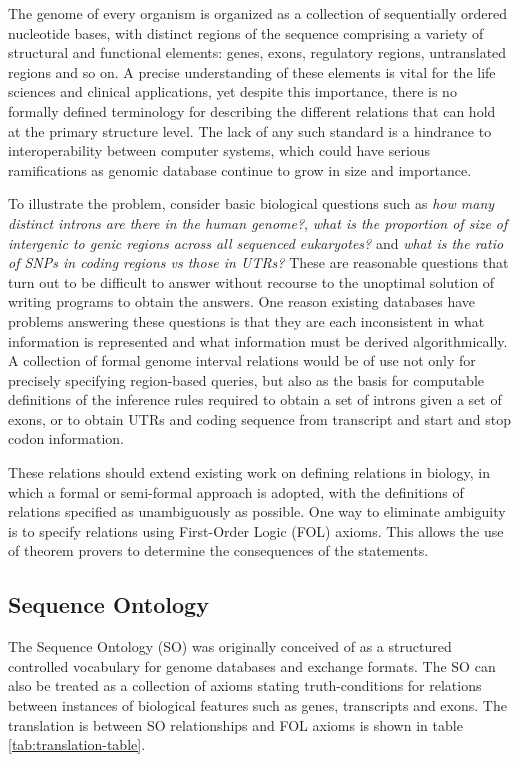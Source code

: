 \documentclass{article}
\begin{document}
The genome of every organism is organized as a collection of
sequentially ordered nucleotide bases, with distinct regions of the
sequence comprising a variety of structural and functional elements:
genes, exons, regulatory regions, untranslated regions and so on. A
precise understanding of these elements is vital for the life sciences
and clinical applications, yet despite this importance, there is no
formally defined terminology for describing the different relations
that can hold at the primary structure level. The lack of any such
standard is a hindrance to interoperability between computer systems,
which could have serious ramifications as genomic database continue to
grow in size and importance.

To illustrate the problem, consider basic biological questions such as
\emph{how many distinct introns are there in the human genome?},
\emph{what is the proportion of size of intergenic to genic regions
  across all sequenced eukaryotes?} and \emph{what is the ratio of
  SNPs in coding regions vs those in UTRs?} These are reasonable
questions that turn out to be difficult to answer without recourse to
the unoptimal solution of writing programs to obtain the answers. One
reason existing databases have problems answering these questions is
that they are each inconsistent in what information is represented and
what information must be derived algorithmically. A collection of
formal genome interval relations would be of use not only for
precisely specifying region-based queries, but also as the basis for
computable definitions of the inference rules required to obtain a set
of introns given a set of exons, or to obtain UTRs and coding sequence
from transcript and start and stop codon information.

These relations should extend existing work on defining relations in
biology\cite{Smith2005}, in which a formal or semi-formal approach is
adopted, with the definitions of relations specified as unambiguously
as possible. One way to eliminate ambiguity is to specify relations
using First-Order Logic (FOL) axioms. This allows the use of theorem
provers to determine the consequences of the statements.

\subsection{Sequence Ontology}

The Sequence Ontology (SO)\cite{Eilbeck2005} was originally conceived
of as a structured controlled vocabulary for genome databases and
exchange formats. The SO can also be treated as a collection of axioms
stating truth-conditions for relations between instances of biological
features such as genes, transcripts and exons. The translation is
between SO relationships and FOL axioms is shown in table
\ref{tab:translation-table}.
\end{document}
